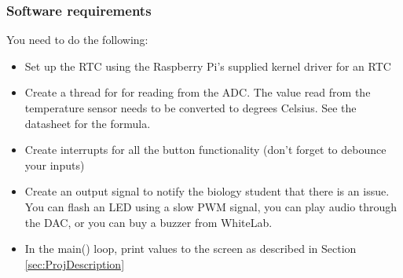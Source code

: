 \subsubsection{Software requirements}
You need to do the following:
\begin{itemize}
    \item Set up the RTC using the Raspberry Pi's supplied kernel driver for an RTC
    \item Create a thread for for reading from the ADC. The value read from the temperature sensor needs to be converted to degrees Celsius. See the datasheet for the formula.
    \item Create interrupts for all the button functionality (don't forget to debounce your inputs)
    \item Create an output signal to notify the biology student that there is an issue. You can flash an LED using a slow PWM signal, you can play audio through the DAC, or you can buy a buzzer from WhiteLab. 
    \item In the main() loop, print values to the screen as described in Section \ref{sec:ProjDescription}
\end{itemize}

